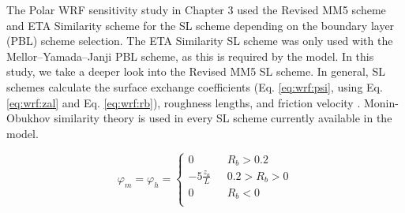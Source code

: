 The Polar WRF sensitivity study in Chapter 3 used the Revised MM5 scheme \citep{paulson:1970, dyer:1970, webb:1970, beljaars:1994} and ETA Similarity scheme for the SL scheme depending on the boundary layer (PBL) scheme selection. The ETA Similarity SL scheme was only used with the Mellor–Yamada–Janji PBL scheme, as this is required by the model. In this study, we take a deeper look into the Revised MM5 SL scheme. In general, SL schemes calculate the surface exchange coefficients (Eq. \ref{eq:wrf:psi}, using Eq. \ref{eq:wrf:zal} and Eq. \ref{eq:wrf:rb}), roughness lengths, and friction velocity \citep{dudhia:2014}. Monin-Obukhov similarity theory is used in every SL scheme currently available in the model. 

\begin{equation}\label{eq:wrf:psi}
\varphi_{m} = 
\varphi_{h} = \begin{cases} 
0 & \text{    } R_{b} > 0.2 \\ 
-5 \frac{z_{a}}{L} & \text{    } 0.2 > R_{b} > 0 \\ 
0 & \text{    } R_{b} < 0 \\ 
\end{cases}
\end{equation}

